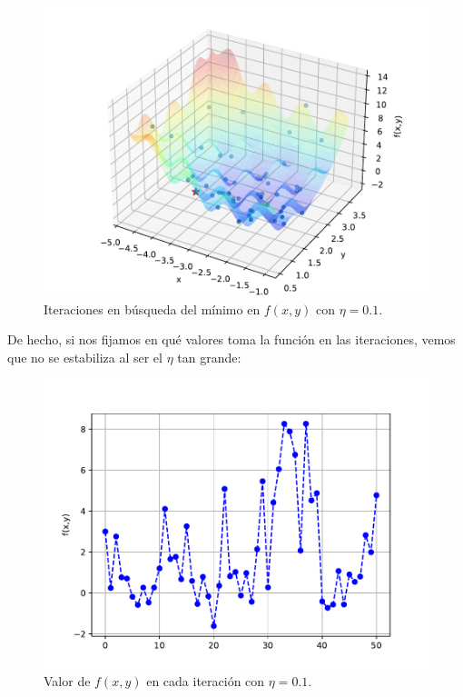 \documentclass[12pt]{scrartcl}
\begin{document}
{\begin{figure}[H]
  \centering
  \includegraphics[scale=0.7]{media/E1-2-loweta-all.pdf}
  \caption{Iteraciones en búsqueda del mínimo en $f(x,y)$ con $\eta = 0.1$.}
\end{figure}

De hecho, si nos fijamos en qué valores toma la función en las iteraciones, vemos que no se estabiliza al ser el $\eta$ tan grande:

\begin{figure}[H]
  \centering
  \includegraphics[scale=0.7]{media/f_evolution_e1-2-01.pdf}
  \caption{Valor de $f(x,y)$ en cada iteración con $\eta = 0.1$.}
\end{figure}

}
\end{document}
